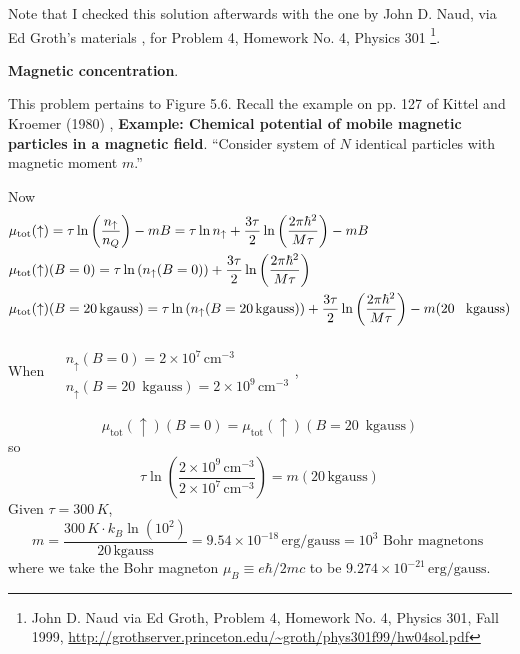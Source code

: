 \documentclass[twoside]{amsart}
\theoremstyle{plain}
\theoremstyle{definition}
\newcommand{\solutionhead}[1]
  {
   \noindent{\small\bf Solution #1.}
   }
\begin{document}
Note that I checked this solution afterwards with the one by John D. Naud, via Ed Groth's materials \cite{EGroth99}, for Problem 4, Homework No. 4, Physics 301 \footnote{John D. Naud via Ed Groth, Problem 4, Homework No. 4, Physics 301, Fall 1999, \url{http://grothserver.princeton.edu/~groth/phys301f99/hw04sol.pdf} }.  




\solutionhead{5} \textbf{Magnetic concentration}.  

This problem pertains to Figure 5.6.  Recall the example on pp. 127 of Kittel and Kroemer (1980) \cite{CKittelHKroemer1980}, \textbf{Example: Chemical potential of mobile magnetic particles in a magnetic field}.  ``Consider system of $N$ identical particles with magnetic moment $m$.''  

Now
\[
\begin{aligned}
  & \mu_{\text{tot}}(\uparrow) = \tau \ln{ \left( \frac{n_{\uparrow}}{n_Q} \right) } - mB = \tau \ln{n_{\uparrow}} + \frac{3\tau}{2} \ln{ \left( \frac{2\pi \hbar^2}{M\tau} \right) } - mB  \\
  & \mu_{\text{tot}}(\uparrow)(B=0) = \tau \ln{ \left( n_{\uparrow}(B=0) \right) } + \frac{3\tau}{2} \ln{\left( \frac{2\pi \hbar^2}{ M\tau }\right) }   \\
  & \mu_{\text{tot}}(\uparrow)(B=20 \, \text{kgauss}) = \tau \ln{ ( n_{\uparrow}(B=20\, \text{kgauss}))} + \frac{3\tau}{2} \ln{\left( \frac{2\pi \hbar^2}{M\tau} \right) } - m (20 \text{ \, kgauss} )
\end{aligned}
\]

When $\begin{aligned} & \quad \\
  & n_{\uparrow}(B=0) = 2\times 10^7 \, \text{cm}^{-3} \\
  & n_{\uparrow}(B=20 \, \text{ kgauss} )  = 2\times 10^9 \, \text{cm}^{-3} \end{aligned}$, 

\[
\mu_{\text{tot}}(\uparrow)(B=0) = \mu_{\text{tot}}(\uparrow)(B=20\, \text{ kgauss} ) 
\]
so
\[
\tau \ln{ \left( \frac{ 2\times 10^9 \, \text{cm}^{-3} }{ 2\times 10^7 \, \text{cm}^{-3} } \right)} = m(20 \, \text{kgauss} )
\]
Given $\tau =300 \, K$, 
\[
m = \frac{300 \, K  \cdot k_B \ln{ (10^2) } }{ 20 \, \text{kgauss} } = 9.54 \times 10^{-18} \, \text{erg}/\text{gauss} = 10^3 \text{ Bohr magnetons }
\]
where we take the Bohr magneton $\mu_B \equiv e\hbar/2mc$ to be $9.274 \times 10^{-21} \, \text{erg}/\text{gauss}$.  
\end{document}
